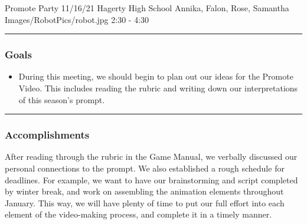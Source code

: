 \insertmeeting 
	{Promote Party} 
	{11/16/21}
	{Hagerty High School}
	{Annika, Falon, Rose, Samantha}
	{Images/RobotPics/robot.jpg}
	{2:30 - 4:30}
	
\noindent\hfil\rule{\textwidth}{.4pt}\hfil
\subsubsection*{Goals}
\begin{itemize}
    \item During this meeting, we should begin to plan out our ideas for the Promote Video. This includes reading the rubric and writing down our interpretations of this season's prompt. 

\end{itemize} 

\noindent\hfil\rule{\textwidth}{.4pt}\hfil

\subsubsection*{Accomplishments}
After reading through the rubric in the Game Manual, we verbally discussed our personal connections to the prompt. We also established a rough schedule for deadlines. For example, we want to have our brainstorming and script completed by winter break, and work on assembling the animation elements throughout January. This way, we will have plenty of time to put our full effort into each element of the video-making process, and complete it in a timely manner.



